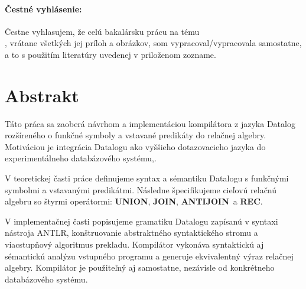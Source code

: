 \documentclass[12pt, twoside]{book}
\newcommand{\UNION}{\textbf{UNION}} \newcommand{\JOIN}{\textbf{JOIN}}
\newcommand{\ANTIJOIN}{\textbf{ANTIJOIN}} \newcommand{\REC}{\textbf{REC}}
\theoremstyle{defstyle}
\begin{document}
\newpage 
\pagestyle{plain}
\paragraph{Čestné vyhlásenie:}
Čestne vyhlasujem, že celú bakalársku prácu na tému \\\uv{\mfnazov}, vrátane všetkých jej príloh a
obrázkov, som vypracoval/vypracovala samostatne, a to s použitím literatúry uvedenej v priloženom
zozname.




\newpage 
\section*{Abstrakt}

Táto práca sa zaoberá návrhom a implementáciou kompilátora z jazyka Datalog rozšíreného o funkčné
symboly a vstavané predikáty do relačnej algebry. Motiváciou je integrácia Datalogu ako vyššieho
dotazovacieho jazyka do experimentálneho databázového systému,.

V teoretickej časti práce definujeme syntax a sémantiku Datalogu s funkčnými symbolmi a vstavanými
predikátmi. Následne špecifikujeme cieľovú relačnú algebru so štyrmi operátormi: \UNION, \JOIN,
\ANTIJOIN\ a \REC.

V implementačnej časti popisujeme gramatiku Datalogu zapísanú v syntaxi nástroja ANTLR, konštruovanie
abstraktného syntaktického stromu a viacstupňový algoritmus prekladu.  Kompilátor vykonáva
syntaktickú aj sémantickú analýzu vstupného programu a generuje ekvivalentný výraz relačnej algebry.
Kompilátor je použiteľný aj samostatne, nezávisle od konkrétneho databázového systému.
\end{document}
